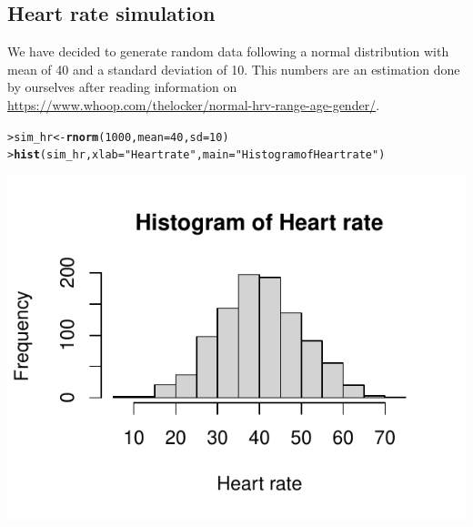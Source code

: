 \documentclass{article}\usepackage[]{graphicx}\usepackage[]{xcolor}
\makeatletter
\def\maxwidth{ %
  \ifdim\Gin@nat@width>\linewidth
    \linewidth
  \else
    \Gin@nat@width
  \fi
}
\newcommand{\hlnum}[1]{\textcolor[rgb]{0.686,0.059,0.569}{#1}}%
\newcommand{\hlstr}[1]{\textcolor[rgb]{0.192,0.494,0.8}{#1}}%
\newcommand{\hlstd}[1]{\textcolor[rgb]{0.345,0.345,0.345}{#1}}%
\newcommand{\hlkwb}[1]{\textcolor[rgb]{0.69,0.353,0.396}{#1}}%
\newcommand{\hlkwc}[1]{\textcolor[rgb]{0.333,0.667,0.333}{#1}}%
\newcommand{\hlkwd}[1]{\textcolor[rgb]{0.737,0.353,0.396}{\textbf{#1}}}%
\newenvironment{kframe}{%
 \def\at@end@of@kframe{}%
 \ifinner\ifhmode%
  \def\at@end@of@kframe{\end{minipage}}%
  \begin{minipage}{\columnwidth}%
 \fi\fi%
 \def\FrameCommand##1{\hskip\@totalleftmargin \hskip-\fboxsep
 \colorbox{shadecolor}{##1}\hskip-\fboxsep
     \hskip-\linewidth \hskip-\@totalleftmargin \hskip\columnwidth}%
 \MakeFramed {\advance\hsize-\width
   \@totalleftmargin\z@ \linewidth\hsize
   \@setminipage}}%
 {\par\unskip\endMakeFramed%
 \at@end@of@kframe}
\newenvironment{knitrout}{}{} %
\makeatother
\begin{document}
\subsection*{Heart rate simulation}
We have decided to generate random data following a normal distribution with mean of 40 and a standard deviation of 10. This numbers are an estimation done by ourselves after reading information on \url{https://www.whoop.com/thelocker/normal-hrv-range-age-gender/}.
\begin{knitrout}\footnotesize
{}\color{fgcolor}\begin{kframe}
\begin{alltt}
\hlstd{> }\hlstd{sim_hr} \hlkwb{<-} \hlkwd{rnorm}\hlstd{(}\hlnum{1000}\hlstd{,} \hlkwc{mean} \hlstd{=} \hlnum{40}\hlstd{,} \hlkwc{sd} \hlstd{=} \hlnum{10}\hlstd{)}
\hlstd{> }\hlkwd{hist}\hlstd{(sim_hr,} \hlkwc{xlab} \hlstd{=} \hlstr{"Heart rate"}\hlstd{,} \hlkwc{main} \hlstd{=} \hlstr{"Histogram of Heart rate"}\hlstd{)}
\end{alltt}
\end{kframe}

{\centering \includegraphics[width=\maxwidth]{figure/sim_hr-1} 

}


\end{knitrout}
\end{document}
